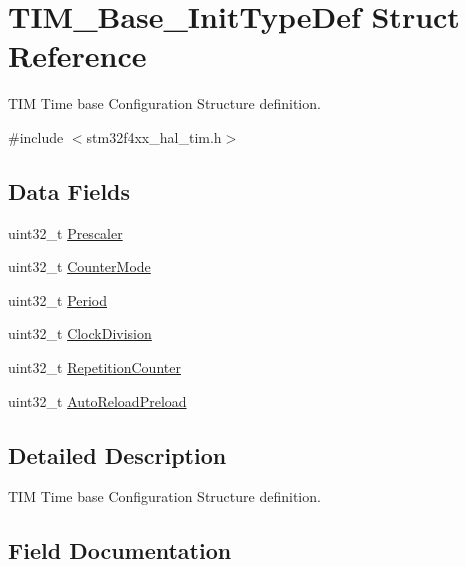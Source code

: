 \hypertarget{struct_t_i_m___base___init_type_def}{}\section{T\+I\+M\+\_\+\+Base\+\_\+\+Init\+Type\+Def Struct Reference}
\label{struct_t_i_m___base___init_type_def}


T\+IM Time base Configuration Structure definition.  




{\ttfamily \#include $<$stm32f4xx\+\_\+hal\+\_\+tim.\+h$>$}

\subsection*{Data Fields}
\begin{DoxyCompactItemize}
\item 
uint32\+\_\+t \hyperlink{struct_t_i_m___base___init_type_def_afc886119e6709bb576d25b5cf8d12d92}{Prescaler}
\item 
uint32\+\_\+t \hyperlink{struct_t_i_m___base___init_type_def_a16d0c02a8f35426360a64c0706656e35}{Counter\+Mode}
\item 
uint32\+\_\+t \hyperlink{struct_t_i_m___base___init_type_def_a8fab2bc184bb756763ff59c729b5be55}{Period}
\item 
uint32\+\_\+t \hyperlink{struct_t_i_m___base___init_type_def_ade59c3a547a5409da845592f30596d17}{Clock\+Division}
\item 
uint32\+\_\+t \hyperlink{struct_t_i_m___base___init_type_def_aa949328175500fd1d112f64a4db5ae79}{Repetition\+Counter}
\item 
uint32\+\_\+t \hyperlink{struct_t_i_m___base___init_type_def_a29e7b91a384f12e6be0f3ffb62ea1ea7}{Auto\+Reload\+Preload}
\end{DoxyCompactItemize}


\subsection{Detailed Description}
T\+IM Time base Configuration Structure definition. 

\subsection{Field Documentation}
\mbox{\label{struct_t_i_m___base___init_type_def_a29e7b91a384f12e6be0f3ffb62ea1ea7}} 
